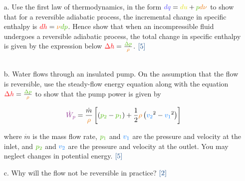 \documentclass[
  twocolumn,
  landscape]{report}
\begin{document}
\begin{enumerate}
\item[a.] Use the first law of thermodynamics, in the form $
{\color[rgb]{0.334690,0.296180,0.998454}dq} = {\color[rgb]{0.878548,0.880173,0.060757}du} + {\color[rgb]{0.315209,0.728565,0.037706}p} {\color[rgb]{0.918231,0.469102,0.038229}d\nu}
$ to show that for a reversible adiabatic process, the incremental change in specific enthalpy is ${\color[rgb]{0.986252,0.007236,0.027423}dh} = {\color[rgb]{0.918231,0.469102,0.038229}\nu} {\color[rgb]{0.315209,0.728565,0.037706}dp}$. Hence show that when an incompressible fluid undergoes a reversible adiabatic process, the total change in specific enthalpy is given by the expression below  
${\color[rgb]{0.986252,0.007236,0.027423}\Delta h} = \frac{{\color[rgb]{0.315209,0.728565,0.037706}\Delta p}}{{\color[rgb]{0.918231,0.469102,0.038229}\rho}}$. ${\color[rgb]{0.028509,0.250925,0.501969}[5]}$ 
\\
\vspace{7 cm}
\\
\item[b.] Water flows through an insulated pump. On the assumption that the flow is reversible, use the steady-flow energy equation along with the equation ${\color[rgb]{0.986252,0.007236,0.027423}\Delta h} = \frac{{\color[rgb]{0.315209,0.728565,0.037706}\Delta p}}{{\color[rgb]{0.918231,0.469102,0.038229}\rho}}$ to show that the pump power is given by

$$
{\color[rgb]{0.562040,0.190215,0.568721}\dot{W}_{p}} = \frac{\dot{m}}{{\color[rgb]{0.918231,0.469102,0.038229}\rho}} \left[ \left({\color[rgb]{0.315209,0.728565,0.037706}p_2} - {\color[rgb]{0.315209,0.728565,0.037706}p_1} \right) + \frac{1}{2} {\color[rgb]{0.918231,0.469102,0.038229}\rho} \left( {\color[rgb]{0.059472,0.501943,0.998465}v_2}^2 - {\color[rgb]{0.059472,0.501943,0.998465}v_1}^2 \right) \right]
$$

where $\dot{m}$ is the mass flow rate, ${\color[rgb]{0.315209,0.728565,0.037706}p_1}$ and ${\color[rgb]{0.059472,0.501943,0.998465}v_1}$ are the pressure and velocity at the inlet, and ${\color[rgb]{0.315209,0.728565,0.037706}p_2}$ and ${\color[rgb]{0.059472,0.501943,0.998465}v_2}$ are the pressure and velocity at the outlet. You may neglect changes in potential energy. ${\color[rgb]{0.028509,0.250925,0.501969}[5]}$

\vspace{5 cm}

\item[c.] Why will the flow not be reversible in practice? ${\color[rgb]{0.028509,0.250925,0.501969}[2]}$

\vspace{2 cm}

\end{enumerate}
\end{document}
